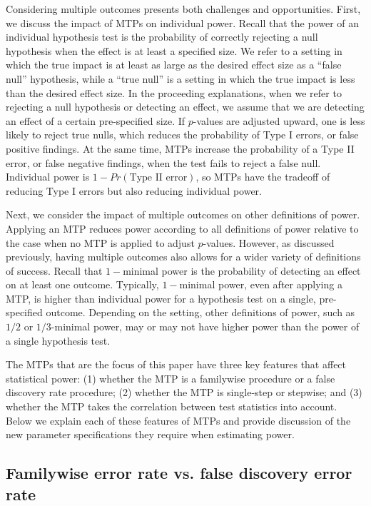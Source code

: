 \documentclass[
]{article}
\begin{document}
Considering multiple outcomes presents both challenges and
opportunities. First, we discuss the impact of MTPs on individual power.
Recall that the power of an individual hypothesis test is the
probability of correctly rejecting a null hypothesis when the effect is
at least a specified size. We refer to a setting in which the true
impact is at least as large as the desired effect size as a ``false
null'' hypothesis, while a ``true null'' is a setting in which the true
impact is less than the desired effect size. In the proceeding
explanations, when we refer to rejecting a null hypothesis or detecting
an effect, we assume that we are detecting an effect of a certain
pre-specified size. If \(p\)-values are adjusted upward, one is less
likely to reject true nulls, which reduces the probability of Type I
errors, or false positive findings. At the same time, MTPs increase the
probability of a Type II error, or false negative findings, when the
test fails to reject a false null. Individual power is
\(1 - Pr(\text{Type II error})\), so MTPs have the tradeoff of reducing
Type I errors but also reducing individual power.

Next, we consider the impact of multiple outcomes on other definitions
of power. Applying an MTP reduces power according to all definitions of
power relative to the case when no MTP is applied to adjust
\(p\)-values. However, as discussed previously, having multiple outcomes
also allows for a wider variety of definitions of success. Recall that
\(1-\)minimal power is the probability of detecting an effect on at
least one outcome. Typically, \(1-\)minimal power, even after applying a
MTP, is higher than individual power for a hypothesis test on a single,
pre-specified outcome. Depending on the setting, other definitions of
power, such as \(1/2\) or \(1/3\)-minimal power, may or may not have
higher power than the power of a single hypothesis test.

The MTPs that are the focus of this paper have three key features that
affect statistical power: (1) whether the MTP is a familywise procedure
or a false discovery rate procedure; (2) whether the MTP is single-step
or stepwise; and (3) whether the MTP takes the correlation between test
statistics into account. Below we explain each of these features of MTPs
and provide discussion of the new parameter specifications they require
when estimating power.

\subsection{Familywise error rate vs. false discovery error rate}
\end{document}
